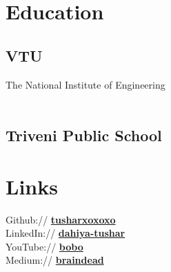 \documentclass[]{deedy-resume-openfont}
\begin{document}
%
%
\lastupdated

%
%

%
%

\begin{minipage}[t]{0.33\textwidth} 


\section{Education} 


\subsection{VTU}
The National Institute of Engineering \\
\\
\sectionsep

\subsection{Triveni Public School}
\sectionsep


\section{Links} 
Github:// \href{https://github.com/tusharxoxoxo}{\bf tusharxoxoxo} \\
LinkedIn://  \href{https://www.linkedin.com/in/dahiya-tushar/}{\bf dahiya-tushar} \\
YouTube://  \href{https://www.youtube.com/channel/UC6tD4ai9wFa5udEpND01Gbg}{\bf bobo} \\
Medium://  \href{https://brain-dead.medium.com/}{\bf braindead}


\end{minipage}
\end{document}
